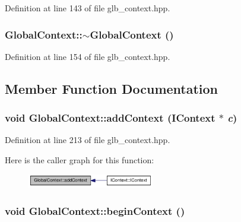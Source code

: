 Definition at line 143 of file glb\_\-context.hpp.\hypertarget{class_global_context_a91e18c107ec197cdafef0c13c2ac9f01}{
\subsubsection[{$\sim$GlobalContext}]{\setlength{\rightskip}{0pt plus 5cm}GlobalContext::$\sim$GlobalContext ()}}
\label{class_global_context_a91e18c107ec197cdafef0c13c2ac9f01}


Definition at line 154 of file glb\_\-context.hpp.

\subsection{Member Function Documentation}
\hypertarget{class_global_context_ab518683a44cc92eb1c1a38a77f29f82d}{
\subsubsection[{addContext}]{\setlength{\rightskip}{0pt plus 5cm}void GlobalContext::addContext ({\bf IContext} $\ast$ {\em c})}}
\label{class_global_context_ab518683a44cc92eb1c1a38a77f29f82d}


Definition at line 213 of file glb\_\-context.hpp.

Here is the caller graph for this function:\nopagebreak
\begin{figure}[H]
\begin{center}
\leavevmode
\includegraphics[width=157pt]{class_global_context_ab518683a44cc92eb1c1a38a77f29f82d_icgraph}
\end{center}
\end{figure}
\hypertarget{class_global_context_a9d7b59f27bc2226614fe2a65f6c3d5d1}{
\subsubsection[{beginContext}]{\setlength{\rightskip}{0pt plus 5cm}void GlobalContext::beginContext ()}}
\label{class_global_context_a9d7b59f27bc2226614fe2a65f6c3d5d1}


